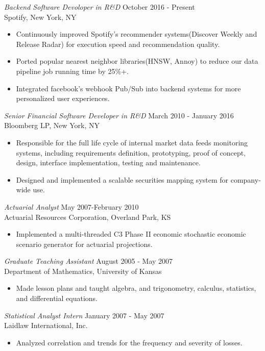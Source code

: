 \documentclass[margin]{res}
\begin{document}
\begin{resume}
		{\sl Backend Software Devoloper in R\&D} \hfill October 2016 - Present\\
		Spotify,
                New York, NY
 \begin{itemize}  
     \item Continuously improved Spotify's recommender systems(Discover Weekly and Release Radar) for execution speed and recommendation quality.
     \item Ported popular nearest neighbor libraries(HNSW, Annoy) to reduce our data pipeline job running time by 25\%+.
     \item Integrated facebook's webhook Pub/Sub into backend systems for more personalized user experiences.
	       \
\end {itemize}
		{\sl Senior Financial Software Developer in R\&D} \hfill March 2010 - January 2016\\
                Bloomberg LP,
                New York, NY 
                 \begin{itemize}  
		 \item Responsible for the full life cycle of internal market data feeds monitoring systems, including requirements definition, prototyping, proof of concept, design, interface implementation, testing and maintenance.
                 \item Designed and implemented a scalable securities mapping system for company-wide use.
		 \end {itemize}
		{\sl Actuarial Analyst} \hfill May 2007-February 2010\\
                Actuarial Resources Corporation,
                Overland Park, KS
                 \begin{itemize} 
                 \item Implemented a multi-threaded C3 Phase II economic stochastic economic scenario generator for
                   actuarial projections.
                 \end{itemize}
                {\sl Graduate Teaching Assistant} \hfill            August 2005 - May 2007\\
                Department of Mathematics, University of Kansas 
                 \begin{itemize}
                 \item Made lesson plans and taught algebra, and trigonometry, calculus, statistics, and differential equations.
                 \end{itemize} 
                {\sl Statistical Analyst Intern} \hfill             January 2007 - May 2007\\
                Laidlaw International, Inc.
                 \begin{itemize}  \itemsep -2pt %
                 \item Analyzed correlation and trends for the frequency and severity of losses.
                 \end{itemize} 

\end{resume}
\end{document}
